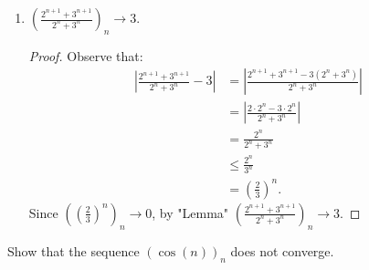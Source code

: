 \documentclass[10pt,twoside,openany]{memoir}
\begin{document}
\begin{exercise}
\begin{enumerate}[label = (\arabic*)]
\begin{proof}
\begin{equation*}
\begin{split}
                                \left|\frac{(n+1)^k b^{n+1}}{n^k b^n} - b\right| 
                                &= \left|\frac{\left((n+1)^k - n^k\right)b}{n^k}\right| \\
                                &= b \cdot \frac{(n+1)^k - n^k}{n^k} \\
                                &= b \left( \left(\frac{n+1}{n}\right)^k - 1\right) \\
                                &= b \left(\left(1 + \frac{1}{n}\right)^k - 1\right).
                            \end{split}
                            \end{equation*}
                        Since $(\frac{1}{n})_n \rightarrow 0$, $\epsilon_n = \left(\left(1 + \frac{1}{n}\right)^k - 1\right)_n \rightarrow 0$. Thus by "Lemma", $\left(\left|\frac{(n+1)^k b^{n+1}}{n^k b^n}\right|\right)_n \rightarrow b$. Since $0 \leq b < 1$, by the ratio test $(n^k b^n)_n \rightarrow 0$.
                    \end{proof}
                \item $\left(\frac{2^{n+1}+3^{n+1}}{2^n + 3^n}\right)_n \rightarrow 3$.
                    \begin{proof}
                        Observe that:
                            \begin{equation*}
                            \begin{split}
                                \left|\frac{2^{n+1} +3^{n+1}}{2^n + 3^n} - 3\right| 
                                & = \left|\frac{2^{n+1} + 3^{n+1} - 3(2^n + 3^n)}{2^n + 3^n}\right| \\
                                & = \left|\frac{2 \cdot 2^n - 3 \cdot 2^n}{2^n + 3^n}\right| \\
                                & = \frac{2^n}{2^n + 3^n} \\
                                & \leq \frac{2^n}{3^n} \\
                                & = \left(\frac{2}{3}\right)^n.
                            \end{split}
                            \end{equation*}
                        Since $\left(\left(\frac{2}{3}\right)^n\right)_n \rightarrow 0$, by "Lemma" $\left(\frac{2^{n+1}+3^{n+1}}{2^n + 3^n}\right)_n \rightarrow 3$.
                    \end{proof}
            \end{enumerate}
    \end{exercise}
    \begin{exercise}
        Show that the sequence $(\cos(n))_n$ does not converge.
    \end{exercise}
\end{document}
